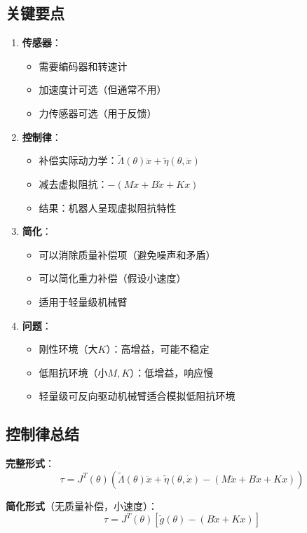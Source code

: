\documentclass[12pt,a4paper]{article}
\begin{document}
\subsection{关键要点}

\begin{enumerate}
\item \textbf{传感器}：
\begin{itemize}
\item 需要编码器和转速计
\item 加速度计可选（但通常不用）
\item 力传感器可选（用于反馈）
\end{itemize}

\item \textbf{控制律}：
\begin{itemize}
\item 补偿实际动力学：$\tilde{\Lambda}(\theta)\ddot{x} + \tilde{\eta}(\theta, \dot{x})$
\item 减去虚拟阻抗：$-(M\ddot{x} + B\dot{x} + Kx)$
\item 结果：机器人呈现虚拟阻抗特性
\end{itemize}

\item \textbf{简化}：
\begin{itemize}
\item 可以消除质量补偿项（避免噪声和矛盾）
\item 可以简化重力补偿（假设小速度）
\item 适用于轻量级机械臂
\end{itemize}

\item \textbf{问题}：
\begin{itemize}
\item 刚性环境（大$K$）：高增益，可能不稳定
\item 低阻抗环境（小$M, K$）：低增益，响应慢
\item 轻量级可反向驱动机械臂适合模拟低阻抗环境
\end{itemize}
\end{enumerate}

\subsection{控制律总结}

\textbf{完整形式}：
\begin{equation}
\tau = J^T(\theta)\left(\tilde{\Lambda}(\theta)\ddot{x} + \tilde{\eta}(\theta, \dot{x}) - (M\ddot{x} + B\dot{x} + Kx)\right)
\end{equation}

\textbf{简化形式}（无质量补偿，小速度）：
\begin{equation}
\tau = J^T(\theta)\left[\tilde{g}(\theta) - (B\dot{x} + Kx)\right]
\end{equation}
\end{document}
